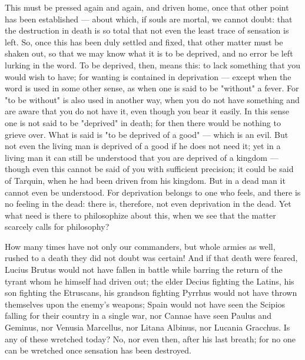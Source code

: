  This must be pressed again and again, and driven home, once that other point has been established — about which, if souls are mortal, we cannot doubt: that the destruction in death is so total that not even the least trace of sensation is left. So, once this has been duly settled and fixed, that other matter must be shaken out, so that we may know what it is to be deprived, and no error be left lurking in the word. To be deprived, then, means this: to lack something that you would wish to have; for wanting is contained in deprivation — except when the word is used in some other sense, as when one is said to be "without" a fever. For "to be without" is also used in another way, when you do not have something and are aware that you do not have it, even though you bear it easily. In this sense one is not said to be "deprived" in death; for then there would be nothing to grieve over. What is said is "to be deprived of a good" — which is an evil. But not even the living man is deprived of a good if he does not need it; yet in a living man it can still be understood that you are deprived of a kingdom — though even this cannot be said of you with sufficient precision; it could be said of Tarquin, when he had been driven from his kingdom. But in a dead man it cannot even be understood. For deprivation belongs to one who feels, and there is no feeling in the dead: there is, therefore, not even deprivation in the dead. Yet what need is there to philosophize about this, when we see that the matter scarcely calls for philosophy?

 How many times have not only our commanders, but whole armies as well, rushed to a death they did not doubt was certain! And if that death were feared, Lucius Brutus would not have fallen in battle while barring the return of the tyrant whom he himself had driven out; the elder Decius fighting the Latins, his son fighting the Etruscans, his grandson fighting Pyrrhus would not have thrown themselves upon the enemy's weapons; Spain would not have seen the Scipios falling for their country in a single war, nor Cannae have seen Paulus and Geminus, nor Venusia Marcellus, nor Litana Albinus, nor Lucania Gracchus. Is any of these wretched today? No, nor even then, after his last breath; for no one can be wretched once sensation has been destroyed.

